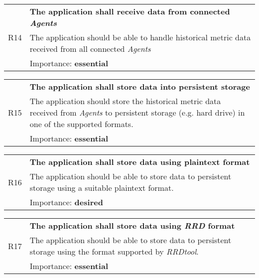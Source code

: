             \vspace{0.5cm}
            \noindent
            \begin{tabular}{ p{0.7cm}|p{14.5cm} }
                \multirow{3}{*}{R14} & \textbf{The application shall receive data from connected \textit{Agents}}\\
                \cline{2-2}
                & The application should be able to handle historical metric data received from all connected \textit{Agents}\\
                \cline{2-2}
                & Importance: \textbf{essential}
            \end{tabular}

            \vspace{0.5cm}
            \noindent
            \begin{tabular}{ p{0.7cm}|p{14.5cm} }
                \multirow{3}{*}{R15} & \textbf{The application shall store data into persistent storage}\\
                \cline{2-2}
                & The application should store the historical metric data received from \textit{Agents} to persistent storage (e.g. hard drive) in one of the supported formats.\\
                \cline{2-2}
                & Importance: \textbf{essential}
            \end{tabular}

            \vspace{0.5cm}
            \noindent
            \begin{tabular}{ p{0.7cm}|p{14.5cm} }
                \multirow{3}{*}{R16} & \textbf{The application shall store data using plaintext format}\\
                \cline{2-2}
                & The application should be able to store data to persistent storage using a suitable plaintext format.\\
                \cline{2-2}
                & Importance: \textbf{desired}
            \end{tabular}

            \vspace{0.5cm}
            \noindent
            \begin{tabular}{ p{0.7cm}|p{14.5cm} }
                \multirow{3}{*}{R17} & \textbf{The application shall store data using \textit{RRD} format}\\
                \cline{2-2}
                & The application should be able to store data to persistent storage using the format supported by \textit{RRDtool}.\\
                \cline{2-2}
                & Importance: \textbf{essential}
            \end{tabular}

